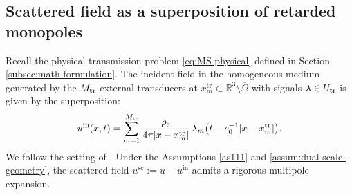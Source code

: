 \documentclass[11pt,a4paper]{article}
\numberwithin{equation}{section}
\newcommand{\R}{\mathbb{R}}
\begin{document}
\subsection{Scattered field as a superposition of retarded monopoles}
\label{subsec:time-domain-asymptotics}
\noindent
Recall the physical transmission problem \eqref{eq:MS-physical} defined in Section \ref{subsec:math-formulation}. The incident field in the homogeneous medium generated by the $M_{\rm tr}$ external transducers at $x_m^{\mathrm{tr}} \subset\R^3\setminus \overline{\Omega}$ with signals $\lambda \in U_{\rm tr}$ is given by the superposition:
\begin{equation}
\label{eq:incident-field-R3}
 u^{\mathrm{in}}(x,t)
 =
 \sum_{m=1}^{M_{\rm tr}}
 \frac{\rho_c}{4\pi|x-x_m^{\mathrm{tr}}|}
 \,\lambda_m\bigl(t-c_0^{-1}|x-x_m^{\mathrm{tr}}|\bigr).
\end{equation}
We follow the setting of \cite{MukherjeeSiniJEE,MukherjeeSiniSIAM}. Under the Assumptions \ref{as111} and  \ref{assum:dual-scale-geometry}, the scattered field $u^{\mathrm{sc}}:=u-u^{\mathrm{in}}$ admits a rigorous multipole expansion.
\end{document}
